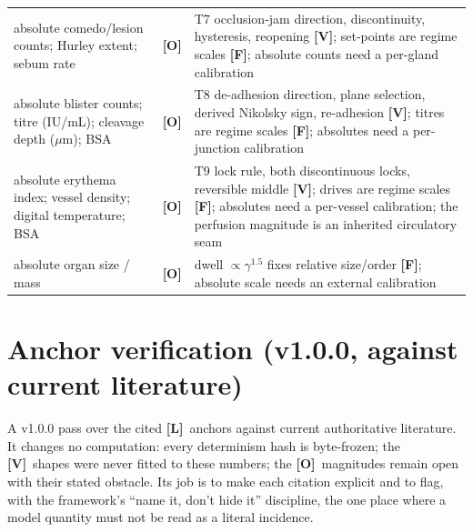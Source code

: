 \documentclass[11pt,a4paper]{article}
\newcommand{\V}{\textcolor{gV}{\textbf{[V]}}}
\newcommand{\Lg}{\textcolor{gL}{\textbf{[L]}}}
\newcommand{\Fg}{\textcolor{gF}{\textbf{[F]}}}
\newcommand{\Og}{\textcolor{gO}{\textbf{[O]}}}
\newcommand{\um}{\ensuremath{\mu}m}
\begin{document}
\begin{longtable}{p{4.6cm} c p{8.6cm}}
absolute comedo/lesion counts; Hurley extent; sebum rate & \Og & T7 occlusion-jam direction, discontinuity, hysteresis, reopening \V; set-points are regime scales \Fg; absolute counts need a per-gland calibration\\
absolute blister counts; titre (IU/mL); cleavage depth (\um); BSA & \Og & T8 de-adhesion direction, plane selection, derived Nikolsky sign, re-adhesion \V; titres are regime scales \Fg; absolutes need a per-junction calibration\\
absolute erythema index; vessel density; digital temperature; BSA & \Og & T9 lock rule, both discontinuous locks, reversible middle \V; drives are regime scales \Fg; absolutes need a per-vessel calibration; the perfusion magnitude is an inherited circulatory seam\\
absolute organ size / mass & \Og & dwell $\propto \gamma^{1.5}$ fixes relative size/order \Fg; absolute scale needs an external calibration\\
\bottomrule
\end{longtable}

\section{Anchor verification (v1.0.0, against current literature)}\label{sec:anchors}

A v1.0.0 pass over the cited \Lg\ anchors against current authoritative literature. It changes no computation:
every determinism hash is byte-frozen; the \V\ shapes were never fitted to these numbers; the \Og\ magnitudes
remain open with their stated obstacle. Its job is to make each citation explicit and to flag, with the framework's
``name it, don't hide it'' discipline, the one place where a model quantity must not be read as a literal incidence.
\end{document}
